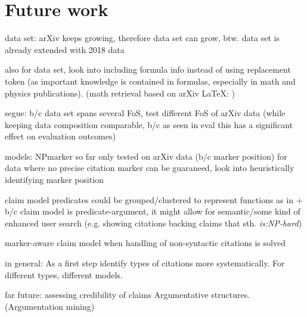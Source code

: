 \chapter{Future work}\label{chap:todo}
data set:
arXiv keeps growing, therefore data set can grow,
btw. data set is already extended with 2018 data\cite{Saier2019}

also for data set, look into including formula info instead of using replacement token (as important knowledge is contained in formulas, especially in math and physics publications). (math retrieval based on arXiv LaTeX: \cite{Aizawa2014,Zanibbi2016})

segue:
b/c data set spans several FoS,
test different FoS of arXiv data (while keeping data composition comparable, b/c as seen in eval this has a significant effect on evaluation outcomes)

models:
NPmarker so far only tested on arXiv data (b/c marker position)
for data where no precise citation marker can be guaraneed, look into heuristically identifying marker position

claim model
predicates could be grouped/clustered to represent functions as in \cite{Gabor2018}
+
b/c claim model is predicate-argument, it might allow for semantic/some kind of enhanced user search (e.g. showing citations backing claims that sth. \emph{is:NP-hard})

marker-aware claim model when handling of non-syntactic citations is solved

in general:
As a first step identify types of citations more systematically.
For different types, different models.

far future:
assessing credibility of claims\cite{Popat2016}
Argumentative structures. (Argumentation mining\cite{Stab2016,Lippi2016,Habernal2017})
